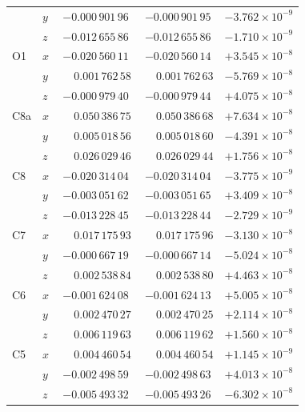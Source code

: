 \begin{longtable}{llccc}
      & $y$ & $-0.000\,901\,96$ & $-0.000\,901\,95$ & $-3.762 \times 10^{-9}$ \\
      & $z$ & $-0.012\,655\,86$ & $-0.012\,655\,86$ & $-1.710 \times 10^{-9}$ \\[2pt]
  O1  & $x$ & $-0.020\,560\,11$ & $-0.020\,560\,14$ & $+3.545 \times 10^{-8}$ \\
      & $y$ & $\phantom{-}0.001\,762\,58$ & $\phantom{-}0.001\,762\,63$ & $-5.769 \times 10^{-8}$ \\
      & $z$ & $-0.000\,979\,40$ & $-0.000\,979\,44$ & $+4.075 \times 10^{-8}$ \\[2pt]
  C8a & $x$ & $\phantom{-}0.050\,386\,75$ & $\phantom{-}0.050\,386\,68$ & $+7.634 \times 10^{-8}$ \\
      & $y$ & $\phantom{-}0.005\,018\,56$ & $\phantom{-}0.005\,018\,60$ & $-4.391 \times 10^{-8}$ \\
      & $z$ & $\phantom{-}0.026\,029\,46$ & $\phantom{-}0.026\,029\,44$ & $+1.756 \times 10^{-8}$ \\[2pt]
  C8  & $x$ & $-0.020\,314\,04$ & $-0.020\,314\,04$ & $-3.775 \times 10^{-9}$ \\
      & $y$ & $-0.003\,051\,62$ & $-0.003\,051\,65$ & $+3.409 \times 10^{-8}$ \\
      & $z$ & $-0.013\,228\,45$ & $-0.013\,228\,44$ & $-2.729 \times 10^{-9}$ \\[2pt]
  C7  & $x$ & $\phantom{-}0.017\,175\,93$ & $\phantom{-}0.017\,175\,96$ & $-3.130 \times 10^{-8}$ \\
      & $y$ & $-0.000\,667\,19$ & $-0.000\,667\,14$ & $-5.024 \times 10^{-8}$ \\
      & $z$ & $\phantom{-}0.002\,538\,84$ & $\phantom{-}0.002\,538\,80$ & $+4.463 \times 10^{-8}$ \\[2pt]
  C6  & $x$ & $-0.001\,624\,08$ & $-0.001\,624\,13$ & $+5.005 \times 10^{-8}$ \\
      & $y$ & $\phantom{-}0.002\,470\,27$ & $\phantom{-}0.002\,470\,25$ & $+2.114 \times 10^{-8}$ \\
      & $z$ & $\phantom{-}0.006\,119\,63$ & $\phantom{-}0.006\,119\,62$ & $+1.560 \times 10^{-8}$ \\[2pt]
  C5  & $x$ & $\phantom{-}0.004\,460\,54$ & $\phantom{-}0.004\,460\,54$ & $+1.145 \times 10^{-9}$ \\
      & $y$ & $-0.002\,498\,59$ & $-0.002\,498\,63$ & $+4.013 \times 10^{-8}$ \\
      & $z$ & $-0.005\,493\,32$ & $-0.005\,493\,26$ & $-6.302 \times 10^{-8}$ \\[2pt]

\end{longtable}
